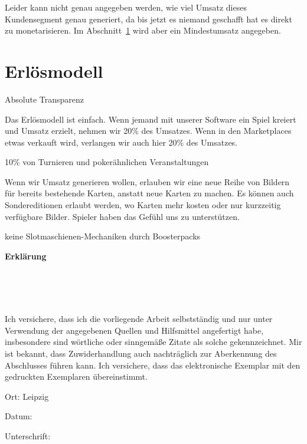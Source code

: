 \documentclass[fontsize=12, a4aper]{scrartcl}
\newcommand\textbox[1]
{
	\parbox{.333\textwidth}{#1}
}
\begin{document}
\noindent Leider kann nicht genau angegeben werden, wie viel Umsatz dieses Kundensegment genau generiert, da bis jetzt es niemand geschafft hat es direkt zu monetarisieren. Im Abschnitt~\ref{sec:Erloesmodell} wird aber ein Mindestumsatz angegeben.

\section{Erlösmodell} \label{sec:Erloesmodell}

Absolute Transparenz

Das Erlösmodell ist einfach. Wenn jemand mit unserer Software ein Spiel kreiert und Umsatz erzielt, nehmen wir 20\% des Umsatzes. Wenn in den Marketplaces etwas verkauft wird, verlangen wir auch hier 20\% des Umsatzes. 

10\% von Turnieren und pokerähnlichen Veranstaltungen

Wenn wir Umsatz generieren wollen, erlauben wir eine neue Reihe von Bildern für bereits bestehende Karten, anstatt neue Karten zu machen. Es können auch Sondereditionen erlaubt werden, wo Karten mehr kosten oder nur kurzzeitig verfügbare Bilder. Spieler haben das Gefühl uns zu unterstützen.

keine Slotmaschienen-Mechaniken durch Boosterpacks




\newpage

\listoftables

\listoffigures

\newpage

\appendix




\newpage

\begin{center}
	
	\fontsize{14pt}{12pt}
	
	\textbf{Erklärung}\\
	
\end{center}

\begin{verbatim}
	
	
	
\end{verbatim}

\noindent Ich versichere, dass ich die vorliegende Arbeit selbstständig und nur unter Verwendung der
angegebenen Quellen und Hilfsmittel angefertigt habe, insbesondere sind wörtliche oder
sinngemäße Zitate als solche gekennzeichnet. Mir ist bekannt, dass Zuwiderhandlung auch
nachträglich zur Aberkennung des Abschlusses führen kann.
Ich versichere, dass das elektronische Exemplar mit den gedruckten Exemplaren übereinstimmt.

\bigskip

\noindent\textbox{Ort: Leipzig\hfill}\textbox{\hfil Datum:\hfil}\textbox{\hfill Unterschrift:}
\end{document}
